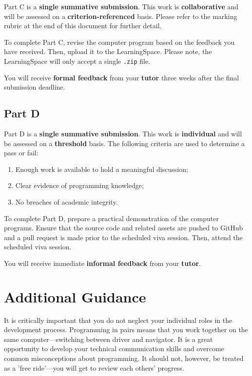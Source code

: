 \documentclass{../../fal_assignment}
\begin{document}
Part C is a \textbf{single summative submission}. This work is \textbf{collaborative} and will be assessed on a \textbf{criterion-referenced} basis. Please refer to the marking rubric at the end of this document for further detail.

To complete Part C, revise the computer program based on the feedback you have received. Then, upload it to the LearningSpace. Please note, the LearningSpace will only accept a single \texttt{.zip} file.

You will receive \textbf{formal feedback} from your \textbf{tutor} three weeks after the final submission deadline.

\subsection*{Part D}

Part D is a \textbf{single summative submission}. This work is \textbf{individual} and will be assessed on a \textbf{threshold} basis.  The following criteria are used to determine a pass or fail:

\begin{enumerate}[label=(\alph*)]
	\item Enough work is available to hold a meaningful discussion;
	\item Clear evidence of programming knowledge;
	\item No breaches of academic integrity.
\end{enumerate}

To complete Part D, prepare a practical demonstration of the computer programs. Ensure that the source code and related assets are pushed to GitHub and a pull request is made prior to the scheduled viva session. Then, attend the scheduled viva session.

You will receive immediate \textbf{informal feedback} from your \textbf{tutor}.

\section*{Additional Guidance}

It is critically important that you do not neglect your individual roles in the development process. Programming in pairs means that you work together on the same computer---switching between driver and navigator. It is a great opportunity to develop your technical communication skills and overcome common misconceptions about programming. It should not, however, be treated as a 'free ride'---you will get to review each others' progress. 
\end{document}
